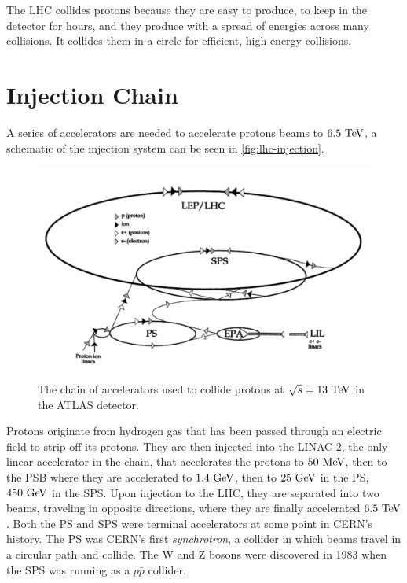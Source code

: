 The \ac{LHC} collides protons because they are easy to produce, to keep in the detector for hours, and they produce with a spread of energies across many collisions. It collides them in a circle for efficient, high energy collisions. 





\section{Injection Chain}

A series of accelerators are needed to accelerate protons beams to $6.5 \TeV$, a schematic of the injection system can be seen in \autoref{fig:lhc-injection}. 

\begin{figure}[htbp]
\centering
\includegraphics[width=.8\textwidth]{figures/Detector/lhc-injectors.png}
\caption{The chain of accelerators used to collide protons at $\sqrt{s} = 13 \TeV$ in the \ac{ATLAS} detector. }
\label{fig:lhc-injection}
\end{figure}

Protons originate from hydrogen gas that has been passed through an electric field to strip off its protons. They are then injected into the \ac{LINAC} 2, the only linear accelerator in the chain, that accelerates the protons to $50 \MeV$, then to the \ac{PSB} where they are accelerated to $1.4 \GeV$, then to $25 \GeV$ in the \ac{PS}, $450 \GeV$ in the \ac{SPS}. Upon injection to the \ac{LHC}, they are separated into two beams, traveling in opposite directions, where they are finally accelerated $6.5 \TeV$. Both the \ac{PS} and \ac{SPS} were terminal accelerators at some point in \ac{CERN}'s history. The \ac{PS} was \ac{CERN}'s first \emph{synchrotron}, a collider in which beams travel in a circular path and collide. The W and Z bosons were discovered in 1983 when the \ac{SPS} was running as a $p\bar{p}$ collider.

